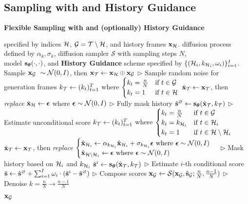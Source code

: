 \subsection{Sampling with \mtd and History Guidance}
\newcommand{\algcomment}[1]{\small{\hfill \(\triangleright\) #1}}
\begin{algorithm}[t]
    \caption{\textbf{Flexible Sampling with \mtd and (optionally) History Guidance}}
    \label{alg:sampling}
    \begin{algorithmic}
     specified by indices ${\mathcal{H}}$, ${\mathcal{G}} = {\mathcal{T}} \setminus {\mathcal{H}}$, and history frames ${\mathbf{x}_{\mathcal{H}}}$.
     diffusion process defined by $\alpha_k, \sigma_k$, diffusion sampler $\mathcal{S}$ with sampling steps $N$,\\
    \textbf{\mtd} model ${\mathbf{s}}_{\bm{\theta}}(\cdot, \cdot)$, and
    \textbf{History Guidance} scheme specified by $\{({\mathcal{H}}_i, k_{{\mathcal{H}}_i}, \omega_i)\}_{i=1}^I$.
    \STATE Sample ${\mathbf{x}}_{\mathcal{G}} ~\sim \mathcal{N}(0, I)$, then ${\mathbf{x}}_{{\mathcal{T}}} \gets {\mathbf{x}}_{{\mathcal{H}}} \oplus {\mathbf{x}}_{{\mathcal{G}}}$ \algcomment{Sample random noise for generation frames}
        \STATE $k_{{\mathcal{T}}} \gets (k_t)_{t=1}^T$ where {\small$\begin{cases} k_t = \frac{n}{N} & \text{if } t \in {\mathcal{G}} \\ k_t = 1 & \text{if } t \in {\mathcal{H}} \end{cases}$}
        \STATE $\hat{{\mathbf{x}}}_{{\mathcal{T}}} \gets {\mathbf{x}}_{{\mathcal{T}}}$, then \emph{replace} $\hat{{\mathbf{x}}}_{{\mathcal{H}}} \gets \bm{\epsilon}$ where $\bm{\epsilon} \sim \mathcal{N}(0, I)$ \algcomment{Fully mask history}
        \STATE $\hat{{\mathbf{s}}}^{\varnothing} \gets {\mathbf{s}}_{\bm{\theta}}(\hat{{\mathbf{x}}}_{{\mathcal{T}}}, k_{{\mathcal{T}}})$ \algcomment{Estimate unconditional score}
            \STATE $k_{{\mathcal{T}}} \gets (k_t)_{t=1}^T$ where {\small$\begin{cases} k_t = \frac{n}{N} & \text{if } t \in {\mathcal{G}} \\ k_t = k_{{\mathcal{H}}_i} & \text{if } t \in {\mathcal{H}}_i \\ k_t = 1 & \text{if } t \in {\mathcal{H}} \setminus {\mathcal{H}}_i \end{cases}$}
            \STATE $\hat{{\mathbf{x}}}_{{\mathcal{T}}} \gets {\mathbf{x}}_{{\mathcal{T}}}$, then \emph{replace} $\begin{cases} \hat{{\mathbf{x}}}_{{\mathcal{H}}_i} \gets \alpha_{k_{{\mathcal{H}}_i}} \hat{{\mathbf{x}}}_{{\mathcal{H}}_i} + \sigma_{k_{{\mathcal{H}}_i}} \bm{\epsilon} \text{ where } \bm{\epsilon} \sim \mathcal{N}(0, I) \\ \hat{{\mathbf{x}}}_{{\mathcal{H}} \setminus {\mathcal{H}}_i} \gets \bm{\epsilon} \text{ where } \bm{\epsilon} \sim \mathcal{N}(0, I) \end{cases}$ \algcomment{Mask history based on ${\mathcal{H}}_i$ and $k_{{\mathcal{H}}_i}$}
            \STATE $\hat{{\mathbf{s}}}^i \gets {\mathbf{s}}_{\bm{\theta}}(\hat{{\mathbf{x}}}_{{\mathcal{T}}}, k_{{\mathcal{T}}})$ \algcomment{Estimate $i$-th conditional score}
        \ENDFOR
        \STATE $\hat{{\mathbf{s}}} \gets \hat{{\mathbf{s}}}^{\varnothing} + \sum_{i=1}^I \omega_i \cdot (\hat{{\mathbf{s}}}^i - \hat{{\mathbf{s}}}^{\varnothing})$ \algcomment{Compose scores}
        \STATE ${\mathbf{x}}_{{\mathcal{G}}} \gets \mathcal{S}({\mathbf{x}}_{{\mathcal{G}}}, \hat{{\mathbf{s}}}_{{\mathcal{G}}}; \frac{n}{N}, \frac{n-1}{N})$ \algcomment{Denoise $k = \frac{n}{N} \rightarrow \frac{n-1}{N}$}
        
    \ENDFOR
     ${\mathbf{x}}_{\mathcal{G}}$
    \end{algorithmic}
\end{algorithm}

